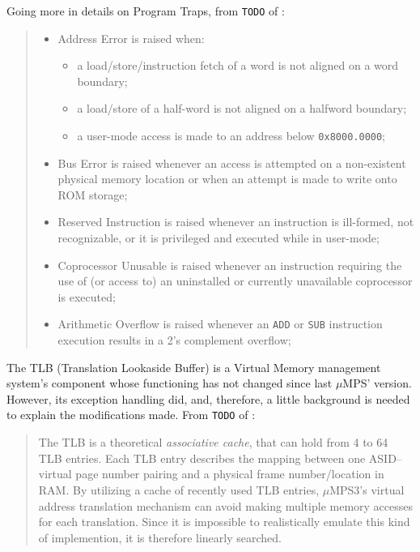 \documentclass[12pt,a4paper,openright,twoside]{report}
\begin{document}
Going more in details on Program Traps, from \texttt{TODO} of \cite{pops}:
\begin{quote}
	\begin{itemize}
		\item Address Error is raised when:
		      \begin{itemize}
			      \item a load/store/instruction fetch of a word is not aligned on a word boundary;
			      \item a load/store of a half-word is not aligned on a halfword boundary;
			      \item a user-mode access is made to an address below \texttt{0x8000.0000};
		      \end{itemize}
		\item Bus Error is raised whenever an access is attempted on a non-existent physical memory location or when an attempt is made to write onto ROM storage;
		\item Reserved Instruction is raised whenever an instruction is ill-formed, not recognizable, or it is privileged and executed while in user-mode;
		\item Coprocessor Unusable is raised whenever an instruction requiring the use of (or access to) an uninstalled or currently unavailable coprocessor is executed;
		\item Arithmetic Overflow is raised whenever an \texttt{ADD} or \texttt{SUB} instruction execution results in a 2's complement overflow;
	\end{itemize}
\end{quote}

The TLB (Translation Lookaside Buffer) is a Virtual Memory management system's component whose functioning has not changed since last $\mu$MPS' version.
However, its exception handling did, and, therefore, a little background is needed to explain the modifications made. From \texttt{TODO} of \cite{pops}:
\begin{quote}
	The TLB is a theoretical \textit{associative cache}, that can hold from 4 to 64 TLB entries.
	Each TLB entry describes the mapping between one ASID–virtual page number pairing and a physical frame number/location in RAM.
	By utilizing a cache of recently used TLB entries, $\mu$MPS3's virtual address translation mechanism can avoid making multiple memory accesses for each translation.
	Since it is impossible to realistically emulate this kind of implemention, it is therefore linearly searched.
\end{quote}
\end{document}

